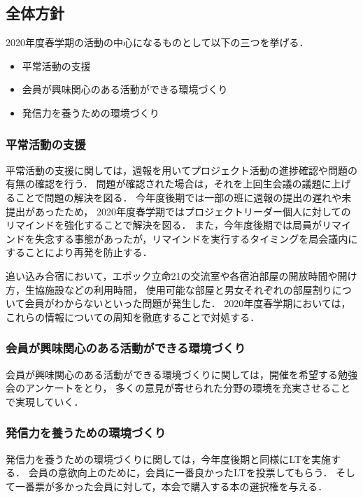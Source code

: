 \subsection*{全体方針}

2020年度春学期の活動の中心になるものとして以下の三つを挙げる．
\begin{itemize}
\item 平常活動の支援
\item 会員が興味関心のある活動ができる環境づくり
\item 発信力を養うための環境づくり
\end{itemize}

\subsubsection*{平常活動の支援}
平常活動の支援に関しては，週報を用いてプロジェクト活動の進捗確認や問題の有無の確認を行う．
問題が確認された場合は，それを上回生会議の議題に上げることで問題の解決を図る．
今年度後期では一部の班に週報の提出の遅れや未提出があったため，
2020年度春学期ではプロジェクトリーダー個人に対してのリマインドを強化することで解決を図る．
また，今年度後期では局員がリマインドを失念する事態があったが，リマインドを実行するタイミングを局会議内にすることにより再発を防止する．

追い込み合宿において，エポック立命21の交流室や各宿泊部屋の開放時間や開け方，生協施設などの利用時間，
使用可能な部屋と男女それぞれの部屋割りについて会員がわからないといった問題が発生した．
2020年度春学期においては，これらの情報についての周知を徹底することで対処する．

\subsubsection*{会員が興味関心のある活動ができる環境づくり}
会員が興味関心のある活動ができる環境づくりに関しては，開催を希望する勉強会のアンケートをとり，
多くの意見が寄せられた分野の環境を充実させることで実現していく．

\subsubsection*{発信力を養うための環境づくり}
発信力を養うための環境づくりに関しては，今年度後期と同様にLTを実施する．
会員の意欲向上のために，会員に一番良かったLTを投票してもらう．
そして一番票が多かった会員に対して，本会で購入する本の選択権を与える．
